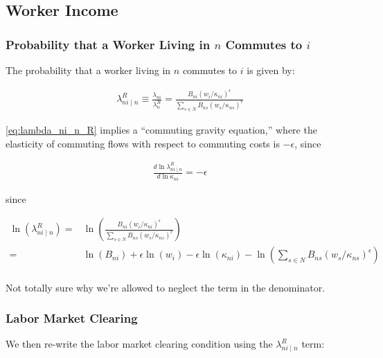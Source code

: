 \documentclass[10pt]{article}
\begin{document}
\subsection{Worker Income}

\subsubsection{Probability that a Worker Living in $n$ Commutes to $i$}

The probability that a worker living in $n$ commutes to $i$ is given by:

\begin{align}
    \lambda_{n i \mid n}^R \equiv \frac{\lambda_{n i}}{\lambda_n^R}=\frac{B_{n i}\left(w_i / \kappa_{n i}\right)^\epsilon}{\sum_{s \in N} B_{n s}\left(w_s / \kappa_{n s}\right)^\epsilon} \label{eq:lambda_ni_n_R}
\end{align}

\eqref{eq:lambda_ni_n_R} implies a 
``commuting gravity equation,''
where the elasticity of commuting flows
with respect to commuting costs 
is $-\epsilon$, since

\begin{align}
    \frac{d \ln \lambda_{n i \mid n}^R}{d \ln \kappa_{n i}}=-\epsilon
\end{align}

since 

\begin{align}
    \ln \left(\lambda_{n i \mid n}^R\right) = &\ln \left(\frac{B_{n i}\left(w_i / \kappa_{n i}\right)^\epsilon}{\sum_{s \in N} B_{n s}\left(w_s / \kappa_{n s}\right)^\epsilon}\right) \\
    = &\ln(B_{ni}) + \epsilon \ln(w_i) - \epsilon \ln(\kappa_{ni}) - \ln\left(\sum_{s \in N} B_{n s}\left(w_s / \kappa_{n s}\right)^\epsilon\right) \\
\end{align}

\begin{questions}
    Not totally sure why we're allowed to neglect the term in the denominator.
\end{questions}

\subsubsection{Labor Market Clearing}

We then re-write the labor market clearing condition
using the $\lambda_{n i \mid n}^R$ term:
\end{document}
